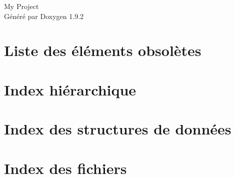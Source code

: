 \documentclass[twoside]{book}
\newcommand{\+}{\discretionary{\mbox{\scriptsize$\hookleftarrow$}}{}{}}
\newcommand{\clearemptydoublepage}{%
    \newpage{\pagestyle{empty}\cleardoublepage}%
  }
\begin{document}
  \raggedbottom
    \hypersetup{pageanchor=false,
                bookmarksnumbered=true,
                pdfencoding=unicode
               }
  \begin{titlepage}
  \vspace*{7cm}
  \begin{center}%
  {\Large My Project}\\
  \vspace*{1cm}
  {\large Généré par Doxygen 1.9.2}\\
  \end{center}
  \end{titlepage}
  \clearemptydoublepage
  \tableofcontents
  \clearemptydoublepage
  \hypersetup{pageanchor=true}
\chapter{Liste des éléments obsolètes}
\label{deprecated}

\chapter{Index hiérarchique}

\chapter{Index des structures de données}

\chapter{Index des fichiers}

\end{document}

